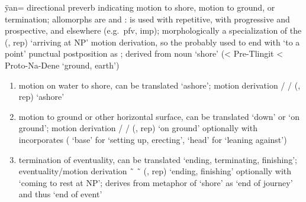 \begin{morphdesc}[resume*=alphalist]
\item[ÿan=]\label{m:ÿan=}
	directional preverb indicating motion to shore, motion to ground, or termination;
	allomorphs are  and :
		 is used with repetitive,
		 with progressive and prospective,
		and  elsewhere (e.g.\ pfv, imp);
	morphologically a specialization of the
		 (,  rep) ‘arriving at NP’
		motion derivation,
	so the  probably used to end with  ‘to a point’ punctual postposition
		as ;
	derived from noun  ‘shore’
		(< Pre-Tlingit  < Proto-Na-Dene  ‘ground, earth’)
	\begin{enumerate}
	\item	motion on water to shore,
		can be translated ‘ashore’;
		motion derivation
			 /  /  (,  rep) ‘ashore’
	\item	motion to ground or other horizontal surface,
		can be translated ‘down’ or ‘on ground’;
		motion derivation
			 /  /  (,  rep) ‘on ground’
			optionally with incorporates ( ‘base’ for ‘setting up, erecting’,
			 ‘head’ for ‘leaning against’)
	\item	termination of eventuality,
		can be translated ‘ending, terminating, finishing’;
		eventuality/motion derivation
			 \~\  \~\  (,  rep) ‘ending, finishing’
			optionally with  ‘coming to rest at NP’;
		derives from metaphor of ‘shore’ as ‘end of journey’ and thus ‘end of event’
	\end{enumerate}


\end{morphdesc}
